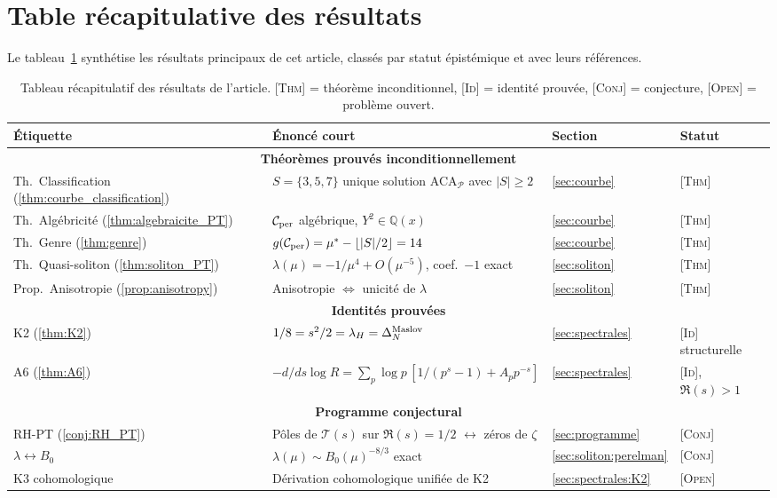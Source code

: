 \section{Table récapitulative des résultats}
\label{app:resultats}

Le tableau~\ref{tab:resultats} synthétise les résultats principaux de cet article, classés par statut épistémique et avec leurs références.

\begin{table}[htbp]
\centering
\small
\begin{tabular}{@{}p{3cm}p{6cm}p{2cm}p{3.5cm}@{}}
\toprule
Étiquette & Énoncé court & Section & Statut \\
\midrule
\multicolumn{4}{c}{\textsf{\textbf{Théorèmes prouvés inconditionnellement}}} \\[2pt]
Th.~Classification (\ref{thm:courbe_classification}) & $S = \{3, 5, 7\}$ unique solution ACA$_{\mathcal P}$ avec $|S| \geq 2$ & \ref{sec:courbe} & \textsc{[Thm]} \\
Th.~Algébricité (\ref{thm:algebraicite_PT}) & $\mathcal{C}_{\rm per}$ algébrique, $Y^{2} \in \mathbb Q(x)$ & \ref{sec:courbe} & \textsc{[Thm]} \\
Th.~Genre (\ref{thm:genre}) & $g(\mathcal{C}_{\rm per}) = \mu^{*} - \lfloor |S|/2 \rfloor = 14$ & \ref{sec:courbe} & \textsc{[Thm]} \\
Th.~Quasi-soliton (\ref{thm:soliton_PT}) & $\lambda(\mu) = -1/\mu^{4} + O(\mu^{-5})$, coef.\ $-1$ exact & \ref{sec:soliton} & \textsc{[Thm]} \\
Prop.~Anisotropie (\ref{prop:anisotropy}) & Anisotropie $\Leftrightarrow$ unicité de $\lambda$ & \ref{sec:soliton} & \textsc{[Thm]} \\
\midrule
\multicolumn{4}{c}{\textsf{\textbf{Identités prouvées}}} \\[2pt]
K2 (\ref{thm:K2}) & $1/8 = s^{2}/2 = \lambda_H = \Delta_N^{\rm Maslov}$ & \ref{sec:spectrales} & \textsc{[Id]} structurelle \\
A6 (\ref{thm:A6}) & $-d/ds \log R = \sum_p \log p\,[1/(p^{s}{-}1) + A_p p^{-s}]$ & \ref{sec:spectrales} & \textsc{[Id]}, $\Re(s) > 1$ \\
\midrule
\multicolumn{4}{c}{\textsf{\textbf{Programme conjectural}}} \\[2pt]
RH-PT (\ref{conj:RH_PT}) & Pôles de $\mathcal T(s)$ sur $\Re(s) = 1/2$ $\leftrightarrow$ zéros de $\zeta$ & \ref{sec:programme} & \textsc{[Conj]} \\
$\lambda \leftrightarrow B_0$ & $\lambda(\mu) \sim B_0(\mu)^{-8/3}$ exact & \ref{sec:soliton:perelman} & \textsc{[Conj]} \\
K3 cohomologique & Dérivation cohomologique unifiée de K2 & \ref{sec:spectrales:K2} & \textsc{[Open]} \\
\bottomrule
\end{tabular}
\caption{Tableau récapitulatif des résultats de l'article. \textsc{[Thm]} = théorème inconditionnel, \textsc{[Id]} = identité prouvée, \textsc{[Conj]} = conjecture, \textsc{[Open]} = problème ouvert.}
\label{tab:resultats}
\end{table}
